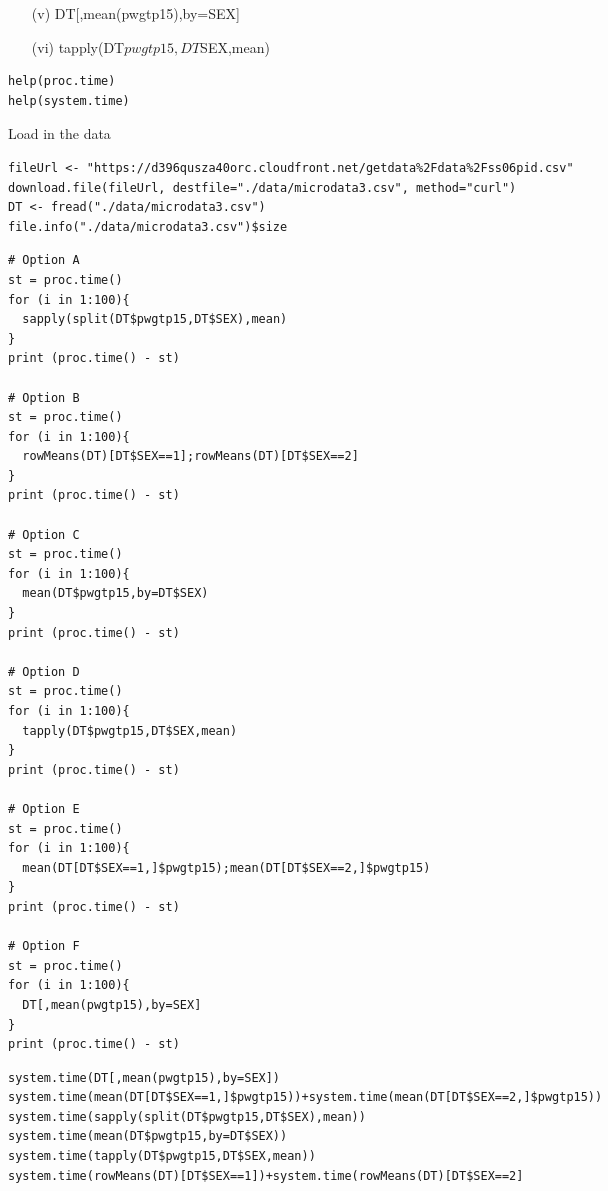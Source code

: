 \documentclass[]{article}
\begin{document}
\begin{framed}
\begin{itemize}
\item[(v)] DT[,mean(pwgtp15),by=SEX] 

\item[(vi)] tapply(DT$pwgtp15,DT$SEX,mean)
\end{itemize}

\begin{framed}
\begin{verbatim}
help(proc.time)
help(system.time)
\end{verbatim}
\end{framed}
Load in the data
\begin{framed}
\begin{verbatim}
fileUrl <- "https://d396qusza40orc.cloudfront.net/getdata%2Fdata%2Fss06pid.csv"
download.file(fileUrl, destfile="./data/microdata3.csv", method="curl")
DT <- fread("./data/microdata3.csv")
file.info("./data/microdata3.csv")$size
\end{verbatim}
\end{framed}
\newpage
\begin{framed}
\begin{verbatim}
# Option A
st = proc.time()
for (i in 1:100){
  sapply(split(DT$pwgtp15,DT$SEX),mean)
}
print (proc.time() - st)

# Option B
st = proc.time()
for (i in 1:100){
  rowMeans(DT)[DT$SEX==1];rowMeans(DT)[DT$SEX==2]
}
print (proc.time() - st)

# Option C
st = proc.time()
for (i in 1:100){
  mean(DT$pwgtp15,by=DT$SEX)
}
print (proc.time() - st)

# Option D
st = proc.time()
for (i in 1:100){
  tapply(DT$pwgtp15,DT$SEX,mean)
}
print (proc.time() - st)

# Option E
st = proc.time()
for (i in 1:100){
  mean(DT[DT$SEX==1,]$pwgtp15);mean(DT[DT$SEX==2,]$pwgtp15)
}
print (proc.time() - st)

# Option F
st = proc.time()
for (i in 1:100){
  DT[,mean(pwgtp15),by=SEX]
}
print (proc.time() - st)
\end{verbatim}
\end{framed}

\newpage
\begin{framed}
\begin{verbatim}
system.time(DT[,mean(pwgtp15),by=SEX])
system.time(mean(DT[DT$SEX==1,]$pwgtp15))+system.time(mean(DT[DT$SEX==2,]$pwgtp15))
system.time(sapply(split(DT$pwgtp15,DT$SEX),mean))
system.time(mean(DT$pwgtp15,by=DT$SEX))
system.time(tapply(DT$pwgtp15,DT$SEX,mean))
system.time(rowMeans(DT)[DT$SEX==1])+system.time(rowMeans(DT)[DT$SEX==2]
\end{verbatim}
\end{framed}



\end{framed}
\end{document}
